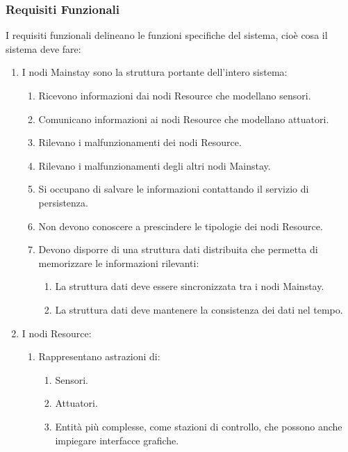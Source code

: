 \subsubsection{Requisiti Funzionali}
I requisiti funzionali delineano le funzioni specifiche del sistema, cioè cosa il sistema deve fare:
\begin{enumerate}
    \item I nodi Mainstay sono la struttura portante dell'intero sistema:
          \begin{enumerate}
              \item Ricevono informazioni dai nodi Resource che modellano sensori.
              \item Comunicano informazioni ai nodi Resource che modellano attuatori.
              \item Rilevano i malfunzionamenti dei nodi Resource.
              \item Rilevano i malfunzionamenti degli altri nodi Mainstay.
              \item Si occupano di salvare le informazioni contattando il servizio di persistenza.
              \item Non devono conoscere a prescindere le tipologie dei nodi Resource.
              \item Devono disporre di una struttura dati distribuita che permetta di memorizzare le informazioni rilevanti:
                    \begin{enumerate}
                        \item La struttura dati deve essere sincronizzata tra i nodi Mainstay.
                        \item La struttura dati deve mantenere la consistenza dei dati nel tempo.
                    \end{enumerate}
          \end{enumerate}
    \item I nodi Resource:
          \begin{enumerate}
              \item Rappresentano astrazioni di:
                    \begin{enumerate}
                        \item Sensori.
                        \item Attuatori.
                        \item Entità più complesse, come stazioni di controllo, che possono anche impiegare interfacce grafiche.
                    \end{enumerate}

\end{enumerate}
\end{enumerate}
